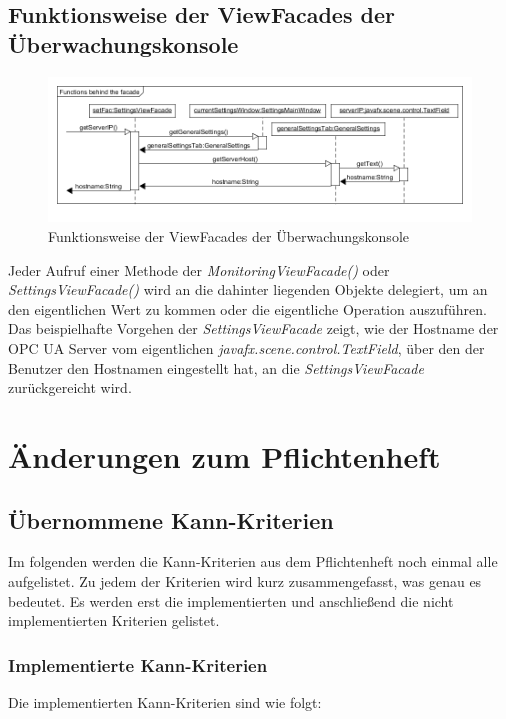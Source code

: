 \documentclass[parskip=full]{scrartcl}
\begin{document}
\subsection{Funktionsweise der ViewFacades der Überwachungskonsole}
\begin{figure}[H]
	\centering
	\includegraphics[scale=0.5]{design/sequence-diagrams/functions-behind-the-facade.png}
	\caption{Funktionsweise der ViewFacades der Überwachungskonsole}
\end{figure}
Jeder Aufruf einer Methode der \emph{MonitoringViewFacade()} oder \emph{SettingsViewFacade()} wird an die dahinter liegenden Objekte delegiert, um an den eigentlichen Wert zu kommen oder die eigentliche Operation auszuführen. Das beispielhafte Vorgehen der \emph{SettingsViewFacade} zeigt, wie der Hostname der OPC UA Server vom eigentlichen \emph{javafx.scene.control.TextField}, über den der Benutzer den Hostnamen eingestellt hat, an die \emph{SettingsViewFacade} zurückgereicht wird.

\pagebreak
\section{Änderungen zum Pflichtenheft}

\subsection{\"Ubernommene Kann-Kriterien}
Im folgenden werden die Kann-Kriterien aus dem Pflichtenheft noch einmal alle aufgelistet. Zu jedem der Kriterien wird
kurz zusammengefasst, was genau es bedeutet. Es werden erst die implementierten und anschlie{\ss}end die nicht implementierten
Kriterien gelistet.

\subsubsection{Implementierte Kann-Kriterien}
Die implementierten Kann-Kriterien sind wie folgt:
\end{document}
